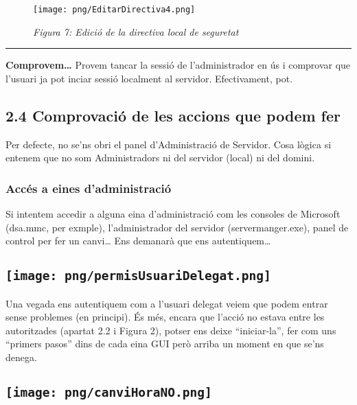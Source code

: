 \documentclass[
  a4paper,
]{article}
\begin{document}
\begin{figure}
\centering
\texttt{[image: png/EditarDirectiva4.png]}
\caption{\emph{Figura 7: Edició de la directiva local de seguretat}}
\end{figure}

\begin{center}\rule{0.5\linewidth}{0.5pt}\end{center}

\textbf{Comprovem\ldots{}} Provem tancar la sessió de l'administrador en
ús i comprovar que l'usuari ja pot inciar sessió localment al servidor.
Efectivament, pot.

\subsection{2.4 Comprovació de les accions que podem
fer}\label{comprovaciuxf3-de-les-accions-que-podem-fer}

Per defecte, no se'ns obri el panel d'Administració de Servidor. Cosa
lògica si entenem que no som Administradors ni del servidor (local) ni
del domini.

\subsubsection{Accés a eines
d'administració}\label{accuxe9s-a-eines-dadministraciuxf3}

Si intentem accedir a alguna eina d'administració com les consoles de
Microsoft (dsa.mmc, per exmple), l'administrador del servidor
(servermanger.exe), panel de control per fer un canvi\ldots{} Ens
demanarà que ens autentiquem\ldots{}

\subsection{\texorpdfstring{\protect\texttt{[image: png/permisUsuariDelegat.png]}}{Figura 8: Autenticació d'usuari}}\label{figura-8-autenticaciuxf3-dusuari}

Una vegada ens autentiquem com a l'usuari delegat veiem que podem entrar
sense problemes (en principi). És més, encara que l'acció no estava
entre les autoritzades (apartat 2.2 i Figura 2), potser ens deixe
``iniciar-la'', fer com uns ``primers pasos'' dins de cada eina GUI però
arriba un moment en que se'ns denega.

\subsection{\texorpdfstring{\protect\texttt{[image: png/canviHoraNO.png]}}{Figura 9: Panel de control, canviar hora}}\label{figura-9-panel-de-control-canviar-hora}
\end{document}
